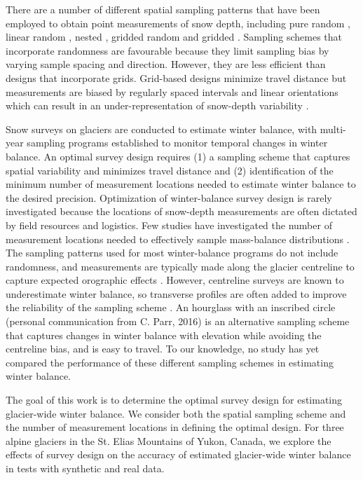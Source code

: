 \documentclass{article}
\begin{document}
There are a number of different spatial sampling patterns that have been employed to obtain point measurements of snow depth, including pure random \citep[e.g.][]{Elder1991}, linear random \cite[e.g.][]{Shea2010}, nested \citep[e.g.][]{Schweizer2008}, gridded random \citep[e.g.][]{Bellaire2008, Elder2009, Bellaire2011} and gridded \citep[e.g.][]{Molotch2005a, Kronholm2007, Lopez2011}. Sampling schemes that incorporate randomness are favourable because they limit sampling bias by varying sample spacing and direction. However, they are less efficient than designs that incorporate grids. Grid-based designs minimize travel distance but measurements are biased by regularly spaced intervals and linear orientations which can result in an under-representation of  snow-depth variability \citep{Kronholm2007}.

Snow surveys on glaciers are conducted to estimate winter balance, with multi-year sampling programs established to monitor temporal changes in winter balance. An optimal survey design requires (1) a sampling scheme that captures spatial variability and minimizes travel distance and (2) identification of the minimum number of measurement locations needed to estimate winter balance to the desired precision.  Optimization of winter-balance survey design is rarely investigated because the locations of snow-depth measurements are often dictated by field resources and logistics. 
Few studies have investigated the number of measurement locations needed to effectively sample mass-balance distributions \citep[c.f.][]{Cogley1999, Fountain1999,Walmsley2015,Surjanovic2016}. The sampling patterns used for most winter-balance programs do not include randomness, and measurements are typically made along the glacier centreline \citep[e.g.][]{Kaser2002} to capture expected orographic effects \citep[e.g.][]{Grunewald2014}. However, centreline surveys are known to underestimate winter balance, so transverse profiles are often added to improve the reliability of the sampling scheme \citep[e.g.][]{Walmsley2015}. An hourglass with an inscribed circle (personal communication from C. Parr, 2016) is an alternative sampling scheme that captures changes in winter balance with elevation while avoiding the centreline bias, and is easy to travel. To our knowledge, no study has yet compared the performance of these different sampling schemes in estimating winter balance.

The goal of this work is to determine the optimal survey design for estimating glacier-wide winter balance. We consider both the spatial sampling scheme and the number of measurement locations in defining the optimal design. For three alpine glaciers in the St. Elias Mountains of Yukon, Canada, we explore the effects of survey design on the accuracy of estimated glacier-wide winter balance in tests with synthetic and real data.
\end{document}
